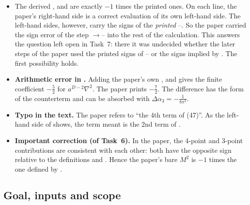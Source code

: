 \begin{discbox}
\begin{itemize}[leftmargin=1.2em,itemsep=2pt]
\item The derived ,  and  are exactly $-1$ times the printed ones.
On each line, the paper's right-hand side is a correct evaluation of its own left-hand side.
The left-hand sides, however, carry the signs of the \emph{printed} --.
So the paper carried the sign error of the step $\to$-- into the rest of the calculation.
This answers the question left open in Task~7: there it was undecided whether the later steps of the paper used the printed signs of -- or the signs implied by .
The first possibility holds.
\item \textbf{Arithmetic error in .} Adding the paper's own ,  and  gives the finite coefficient $-\tfrac52$ for $a^{D-2}\nabla^2$.
The paper prints $-\tfrac72$.
The difference has the form of the counterterm  and can be absorbed with $\Delta\alpha_3=-\tfrac{1}{8\pi^2}$.
\item \textbf{Typo in the text.} The paper refers to ``the 4th term of (47)''.
As the left-hand side of  shows, the term meant is the 2nd term of .
\item \textbf{Important correction (of Task~6).} In the paper, the 4-point and 3-point contributions are consistent with each other: both have the opposite sign relative to the definitions  and .
Hence the paper's bare $M^2$ is $-1$ times the one defined by .
\end{itemize}
\end{discbox}

\subsection{Goal, inputs and scope}


